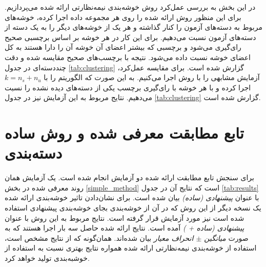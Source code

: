 در این بخش به بررسی عمل‌کرد روش خوشه‌بندی نیمه‌نظارتی ارائه شده می‌پردازیم. برای این منظور روش ارائه شده را روی هر مجموعه داده اجرا کرده، خوشه‌های مربوط به دسته‌های آزمون را کنار گذاشته  و هر یک از خوشه‌های دیگر را به یک دسته از دسته‌های آزمون نسبت می‌دهیم. برای این کار در هر خوشه بر اساس برچسبی صحیح رای‌گیری می‌شود و برچسبی که بیشتر اعضای آن خوشه آن را دارا هستند به کل اعضای خوشه نسبت داده می‌شود. نتیجه با برچسب‌های صحیح مقایسه شده و دقت چنددسته‌ای در جدول \ref{tab:clustering} گزارش شده است.
 برای مقایسه عمل‌کرد، آزمایش مشابهی را با روش  اجرا می‌کنیم. به این صورت که  الگوریتم  را با $k=n_s + n_u$ اجرا کرده و با هر خوشه با رای‌گیری برچسب یکی از دسته‌های دیده نشده را نسبت می‌دهیم. نتایج مربوط به این آزمایش نیز در جدول \ref{tab:clustering} گزارش شده است.

\section{تابع مطابقت معرفی شده و روش ساده دسته‌بندی}\label{exp:comp}
برای سنجش تابع مطابقت ارائه شده دو آزمایش انجام شده است. یک آزمایش همان روند معرفی شده در بخش \ref{simple_method} است که نتایج آن در جدول \ref{tab:results} با عنوان
\textit{پیشنهادی (ساده) }
بیان شده است. برای نشان‌دادن تاثیر خوشه‌بندی ارائه شده یک نسخه دیگر از این روش که در آن از خوشه‌بندی  بجای خوشه‌بندی پیشنهادی استفاده شده است نیز مورد آزمایش قرار گرفته است. نتایج مربوط به این روش با عنوان
\textit{ پیشنهادی (ساده +  ) }
آمده است. نتایج ارائه شده حاصل سه بار اجرا هستند که به صورت
\textit{ میانگین $\pm$ انحراف معیار }
بیان شده‌اند. همان‌گونه که از نتایج مشخص است، استفاده از خوشه‌بندی نیمه‌نظارتی ارائه شده همواره نتایج بهتری نسبت به استفاده از خوشبه‌بندی   تولید خواهد کرد.
